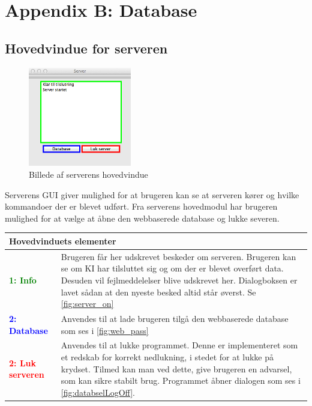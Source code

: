 \chapter*{Appendix B: Database}
\section*{Hovedvindue for serveren}
\begin{figure}[htbp]
	\centering
	\includegraphics[width=0.4\textwidth]{billeder/database/server}
	\caption{Billede af serverens hovedvindue}
	\label{fig:server}
\end{figure}
Serverens GUI giver mulighed for at brugeren kan se at serveren kører og hvilke kommandoer der er blevet udført. Fra serverens hovedmodul har brugeren mulighed for at vælge at åbne den webbaserede database og lukke severen.
\begin{table}[H]
\begin{tabular}{l p{12.5cm}}
\multicolumn{2}{l}{Hovedvinduets elementer} \\
\hline
\textcolor{green}{\textbf{1: Info}}
&Brugeren får her udskrevet beskeder om serveren. Brugeren kan se om KI har tilsluttet sig og om der er blevet overført data. Desuden vil fejlmeddelelser blive udskrevet her. Dialogboksen er lavet sådan at den nyeste besked altid står øverst. Se \ref{fig:server_on}\\

\textcolor{blue}{\textbf{2: Database}}
&Anvendes til at lade brugeren tilgå den webbaserede database som ses i \ref{fig:web_pass}\\

\textcolor{red}{\textbf{2: Luk serveren}}
&Anvendes til at lukke programmet. Denne er implementeret som et redskab for korrekt nedlukning, i stedet for at lukke på krydset. Tilmed kan man ved dette, give brugeren en advarsel, som kan sikre stabilt brug. Programmet åbner dialogen som ses i \ref{fig:databselLogOff}.\\

\end{tabular}
\end{table}

